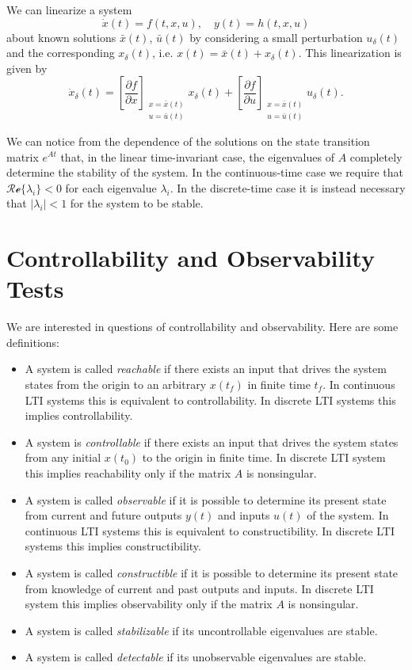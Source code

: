 \documentclass{report}
\begin{document}
We can linearize a system
$$
\dot{x}(t) = f(t, x, u), \quad
y(t) = h(t, x, u)
$$
about known solutions $\bar{x}(t)$,
$\bar{u}(t)$ by considering a small perturbation $u_\delta(t)$ and the
corresponding $x_\delta(t)$, i.e.
$x(t) = \bar{x}(t) + x_\delta(t)$. This linearization is given by
$$
\dot{x}_\delta(t) =
\left[\frac{\partial f}{\partial x}\right]
  _{\substack{x = \bar{x}(t) \\ u = \bar{u}(t)}}
x_\delta(t)
+
\left[\frac{\partial f}{\partial u}\right]
  _{\substack{x = \bar{x}(t) \\ u = \bar{u}(t)}}
u_\delta(t).
$$

We can notice from the dependence of the solutions on
the state transition matrix $e^{At}$ that, in the linear
time-invariant case, the eigenvalues of $A$
completely determine the stability of the system. In the
continuous-time case we require that
$\mathcal{Re}\{\lambda_i\} < 0$ for each eigenvalue $\lambda_i$. In
the discrete-time case it is instead necessary that
$|\lambda_i| < 1$ for the system to be stable.

\section{Controllability and Observability Tests}

We are interested in questions of controllability and
observability. Here are some definitions:
\begin{itemize}
  \item{
    A system is called \emph{reachable} if there exists an input that
    drives the system states from the origin to an arbitrary $x(t_f)$
    in finite time $t_f$. In continuous LTI systems this is
    equivalent to controllability. In discrete LTI systems this
    implies controllability.
  }
  \item{
    A system is \emph{controllable} if there exists an input that
    drives the system states from any initial $x(t_0)$ to the origin
    in finite time. In discrete LTI system this implies reachability
    only if the matrix $A$ is nonsingular.
  }
  \item{
    A system is called \emph{observable} if it is possible to
    determine its present state from current and future outputs $y(t)$
    and inputs $u(t)$ of the system. In continuous LTI systems this is
    equivalent to constructibility. In discrete LTI systems this
    implies constructibility.
  }
  \item{
    A system is called \emph{constructible} if it is possible to
    determine its present state from knowledge of current and past
    outputs and inputs. In discrete LTI system this implies
    observability only if the matrix $A$ is nonsingular.
  }
  \item{
    A system is called \emph{stabilizable} if its uncontrollable
    eigenvalues are stable.
  }
  \item{
    A system is called \emph{detectable} if its unobservable
    eigenvalues are stable.
  }
\end{itemize}
\end{document}
